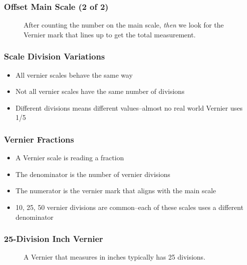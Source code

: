 \begin{frame}
	\frametitle{Offset Main Scale (2 of 2)}
    
    \begin{figure}
        \centering
        \resizebox{0.75\columnwidth}{!}{
            
            }
        
        \vspace{0.5em}
        {\footnotesize After counting the number on the main scale, \emph{then} we look for the Vernier mark that lines up to get the total measurement.\par}
    \end{figure} 
\end{frame}

\begin{frame}
	\frametitle{Scale Division Variations}

    \begin{itemize}[<+- | alert@+>]
        \item All vernier scales behave the same way
        \item Not all vernier scales have the same number of divisions
        \item Different divisions means different values--almost no real world Vernier uses 1/5
    \end{itemize}    
\end{frame}

\begin{frame}
	\frametitle{Vernier Fractions}

    \begin{itemize}[<+- | alert@+>]
        \item A Vernier scale is reading a fraction
        \item The denominator is the number of vernier divisions
        \item The numerator is the vernier mark that aligns with the main scale
        \item 10, 25, 50 vernier divisions are common--each of these scales uses a different denominator
    \end{itemize}    
\end{frame}

\begin{frame}
	\frametitle{25-Division Inch Vernier}

    \begin{figure}
        \centering
        \resizebox{0.75\columnwidth}{!}{
            
            }
        
        \vspace{0.5em}
        {\footnotesize A Vernier that measures in inches typically has 25 divisions.\par}
    \end{figure}  
\end{frame}

